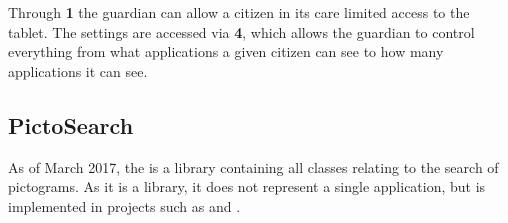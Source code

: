 
Through \textbf{1} the guardian can allow a citizen in its care limited access
to the tablet. The settings are accessed via \textbf{4}, which allows the
guardian to control everything from what applications a given citizen can see to
how many applications it can see.


% 
% 
% 
% 
% 

\subsection{PictoSearch}\label{PictoSearchReview}
As of March 2017, the  is a library containing all
classes relating to the search of pictograms. As it is a library, it does not
represent a single application, but is implemented in projects such as
 and .\nl

